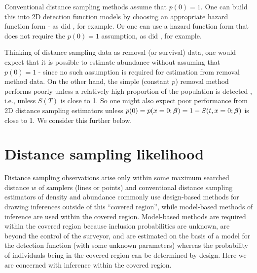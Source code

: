 \documentclass[useAMS,usenatbib,referee]{biom}
\begin{document}
Conventional distance sampling methods assume that $p(0)=1$. One can build this into 2D detection function models by choosing an appropriate hazard function form - as did \cite{Hayes+Buckland:83}, for example. Or one can use a hazard function form that does not require the $p(0)=1$ assumption, as did \cite{Langrock+al:13}, for example. 

Thinking of distance sampling data as removal (or survival) data, one would expect that it is possible to estimate abundance without assuming that $p(0)=1$ - since no such assumption is required for estimation from removal method data. On the other hand, the simple (constant $p$) removal method performs poorly unless a relatively high proportion of the population is detected \citep[see][Table 7.3, for example]{Seber:82}, i.e., unless $S(T)$ is close to 1. So one might also expect poor performance from 2D distance sampling estimators unless $p(0)=p(x=0;{\mbox{\boldmath $\beta$}})=1-S(t,x=0;{\mbox{\boldmath $\beta$}})$ is close to 1. We consider this further below.



\section{Distance sampling likelihood\label{sec:DSlikelihood}}



Distance sampling observations arise only within some maximum searched distance $w$ of samplers (lines or points) and conventional distance sampling estimators of density and abundance commonly use design-based methods for drawing inferences outside of this ``covered region'', while model-based methods of inference are used within the covered region. Model-based methods are required within the covered region because inclusion probabilities are unknown, are beyond the control of the surveyor, and are estimated on the basis of a model for the detection function (with some unknown parameters) whereas the probability of individuals being in the covered region can be determined by design. Here we are concerned with inference within the covered region.
\end{document}
